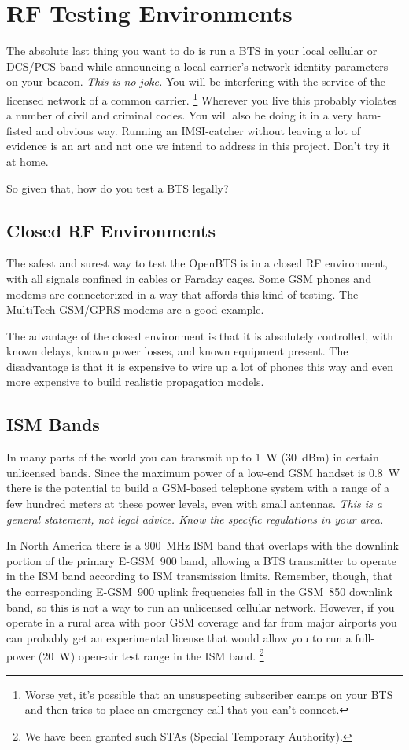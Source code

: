 \documentclass[11pt]{book}
\begin{document}
\section{RF Testing Environments}
The absolute last thing you want to do is run a BTS in your local cellular or DCS/PCS band while announcing a local carrier's network identity parameters on your beacon.  \emph{This is no joke.}  You will be interfering with the service of the licensed network of a common carrier.%
\footnote{Worse yet, it's possible that an unsuspecting subscriber camps on your BTS and then tries to place an emergency call that you can't connect.}
Wherever you live this probably violates a number of civil and criminal codes.  You will also be doing it in a very ham-fisted and obvious way.  Running an IMSI-catcher without leaving a lot of evidence is an art and not one we intend to address in this project.  Don't try it at home.

So given that, how do you test a BTS legally?

\subsection{Closed RF Environments}
The safest and surest way to test the OpenBTS is in a closed RF environment, with all signals confined in cables or Faraday cages.  Some GSM phones and modems are connectorized in a way that affords this kind of testing.  The MultiTech GSM/GPRS modems are a good example.

The advantage of the closed environment is that it is absolutely controlled, with known delays, known power losses, and known equipment present.  The disadvantage is that it is expensive to wire up a lot of phones this way and even more expensive to build realistic propagation models.

\subsection{ISM Bands}
In many parts of the world you can transmit up to 1~W (30~dBm) in certain unlicensed bands. Since the maximum power of a low-end GSM handset is 0.8~W there is the potential to build a GSM-based telephone system with a range of a few hundred meters at these power levels, even with small antennas.
\emph{This is a general statement, not legal advice.  Know the specific regulations in your area.}

In North America there is a 900~MHz ISM band that overlaps with the downlink portion of the primary E-GSM~900 band, allowing a BTS transmitter to operate in the ISM band according to ISM transmission limits.  Remember, though, that the corresponding E-GSM~900 uplink frequencies fall in the GSM~850 downlink band, so this is not a way to run an unlicensed cellular network.  However, if you operate in a rural area with poor GSM coverage and far from major airports you can probably get an experimental license that would allow you to run a full-power (20~W) open-air test range in the ISM band.%
\footnote{We have been granted such STAs (Special Temporary Authority).}
\end{document}
